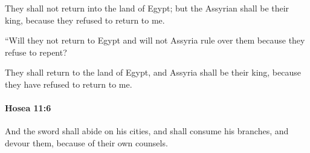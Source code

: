 			\begin{versebox}
					\item[BHS] 
					\item[LXX] 
					\item[ASV] They shall not return into the land of Egypt; but the Assyrian shall be their king, because they refused to return to me.
					\item[NIV] “Will they not return to Egypt and will not Assyria rule over them because they refuse to repent?
					\item[NRSV] They shall return to the land of Egypt, and Assyria shall be their king, because they have refused to return to me.
			\end{versebox}

		\paragraph{Hosea 11:6} %
			\label{HOSEA-11-6}

			And the sword shall abide on his cities, and shall consume his branches, and devour them, because of their own counsels.

